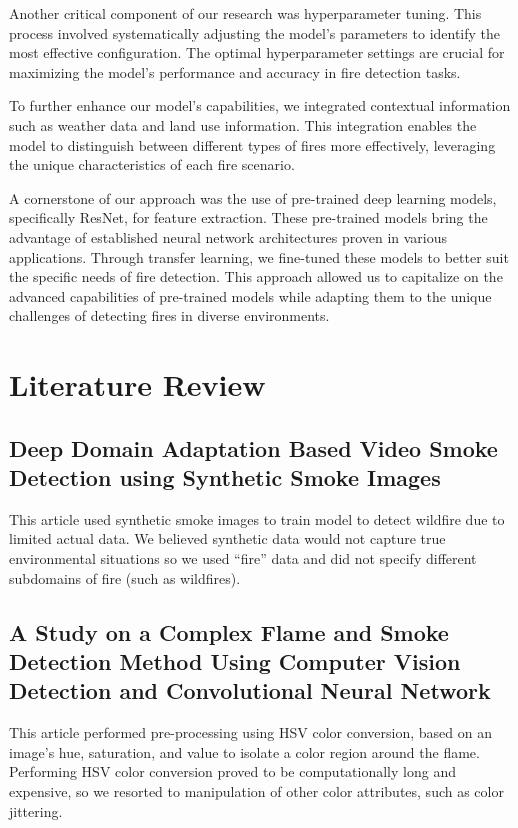 Another critical component of our research was hyperparameter tuning. This process involved systematically adjusting the model's parameters to identify the most effective configuration. The optimal hyperparameter settings are crucial for maximizing the model's performance and accuracy in fire detection tasks.

To further enhance our model's capabilities, we integrated contextual information such as weather data and land use information. This integration enables the model to distinguish between different types of fires more effectively, leveraging the unique characteristics of each fire scenario.

A cornerstone of our approach was the use of pre-trained deep learning models, specifically ResNet, for feature extraction. These pre-trained models bring the advantage of established neural network architectures proven in various applications. Through transfer learning, we fine-tuned these models to better suit the specific needs of fire detection. This approach allowed us to capitalize on the advanced capabilities of pre-trained models while adapting them to the unique challenges of detecting fires in diverse environments.

\section{Literature Review}

\subsection{Deep Domain Adaptation Based Video Smoke Detection using Synthetic Smoke Images~\citep{Xu2017}}

This article used synthetic smoke images to train model to detect wildfire due to limited actual data.
We believed synthetic data would not capture true environmental situations so we used “fire” data and did not specify different subdomains of fire (such as wildfires).

\subsection{A Study on a Complex Flame and Smoke Detection Method Using Computer Vision Detection and Convolutional Neural Network
	~\citep{fire5040108}}

This article performed pre-processing using HSV color conversion, based on an image’s hue, saturation, and value to isolate a color region around the flame. Performing HSV color conversion proved to be computationally long and expensive, so we resorted to manipulation of other color attributes, such as color jittering.
	

